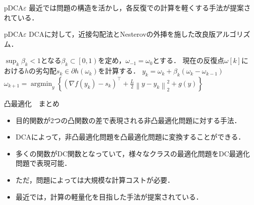 \documentclass[aspectratio=169, dvipdfmx, 10.5pt]{beamer} %
\DeclareMathOperator{\argmin}{argmin}
\begin{document}
\begin{frame}{pDCA$\varepsilon$}
    最近では問題の構造を活かし，各反復での計算を軽くする手法が提案されている．
    \begin{itembox}[l]{pDCA$\varepsilon$}
        DCAに対して，近接勾配法とNesterovの外挿を施した改良版アルゴリズム．
    \end{itembox}
    \begin{algorithm}[H]
        \caption{Calculate Problem (\ref{DCFunc}) with pDCA$e$}
        \label{pDCAe}
        \begin{algorithmic}[1]
            \STATE $\sup_{k} \beta_k < 1$となる$\beta_k \subset \left[0, 1\right)$を定め，$\omega_{-1} = \omega_0$とする．
            \STATE 現在の反復点$\omega[k]$における$h$の劣勾配$s_k \in \partial h(\omega_k)$を計算する．
            \STATE $y_k = \omega_k + \beta_k(\omega_k - \omega_{k-1})$
            \STATE $\omega_{k+1} = \argmin_{y} \left\{\left(\nabla f(y_k) - s_k \right)^{\top} + \frac{L}{2} \left\|y-y_k\right\|_{2}^{2} + g(y) \right\}$
            \ENDFOR
        \end{algorithmic}
    \end{algorithm}
\end{frame}

\begin{frame}{凸最適化　まとめ}
    \begin{itemize}
        \item 目的関数が2つの凸関数の差で表現される非凸最適化問題に対する手法．
        \item DCAによって，非凸最適化問題を凸最適化問題に変換することができる．
        \item 多くの関数がDC関数となっていて，様々なクラスの最適化問題をDC最適化問題で表現可能．
        \item ただ，問題によっては大規模な計算コストが必要．
        \item 最近では，計算の軽量化を目指した手法が提案されている．
    \end{itemize}
\end{frame}
\end{document}
